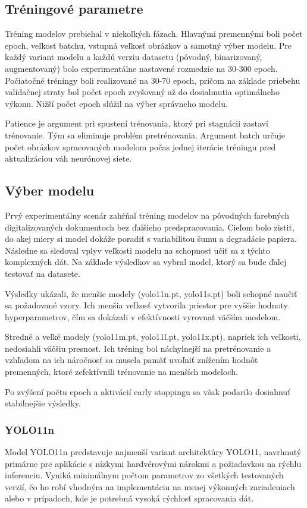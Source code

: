     \subsection{Tréningové parametre}
    Tréning modelov prebiehal v niekoľkých fázach. Hlavnými premennými boli počet epoch, veľkosť batchu, vstupná veľkosť obrázkov a samotný výber modelu. Pre každý variant modelu a každú verziu datasetu (pôvodný, binarizovaný, augmentovaný) bolo experimentálne nastavené rozmedzie na 30-300 epoch. Počiatočné tréningy boli realizované na 30-70 epoch, pričom na základe priebehu validačnej straty bol počet epoch zvyšovaný až do dosiahnutia optimálneho výkonu. Nižší počet epoch slúžil na výber správneho modelu.

    Patience je argument pri spustení trénovania, ktorý pri stagnácii zastaví trénovanie. Tým sa eliminuje problém pretrénovania. Argument batch určuje počet obrázkov spracovaných modelom počas jednej iterácie tréningu pred aktualizáciou váh neurónovej siete\cite{ultralytics_batch}.
    \subsection{Výber modelu}
            Prvý experimentálny scenár zahŕňal tréning modelov na pôvodných farebných digitalizovaných dokumentoch bez ďalšieho predspracovania. Cieľom bolo zistiť, do akej miery si model dokáže poradiť s variabilitou šumu a degradácie papiera. Následne sa sledoval vplyv veľkosti modelu na schopnosť učiť sa z týchto komplexných dát. Na základe výsledkov sa vybral model, ktorý sa bude ďalej testovať na datasete.
    
            Výsledky ukázali, že menšie modely (yolo11n.pt, yolo11s.pt) boli schopné naučiť sa požadované vzory. Ich menšia veľkosť vytvorila priestor pre vyššie hodnoty hyperparametrov, čím sa dokázali v efektívnosti vyrovnať väčším modelom.
            
            Stredné a veľké modely (yolo11m.pt, yolo11l.pt, yolo11x.pt), napriek ich veľkosti, nedosiahli väčšiu presnosť. Ich tréning bol náchylnejší na pretrénovanie a vzhľadom na ich náročnosť sa musela pamäť uvoľniť znížením hodnôt premenných, ktoré zefektívnili trénovanie na menších modeloch.
            
            Po zvýšení počtu epoch a aktivácií early stoppingu sa však podarilo dosiahnuť stabilnejšie výsledky.
            \subsubsection{YOLO11n}
            Model YOLO11n predstavuje najmenší variant architektúry YOLO11, navrhnutý primárne pre aplikácie s nízkymi hardvérovými nárokmi a požiadavkou na rýchlu inferenciu. Vyniká minimálnym počtom parametrov zo všetkých testovaných verzií, čo ho robí vhodným na implementáciu na menej výkonných zariadeniach alebo v prípadoch, kde je potrebná vysoká rýchlosť spracovania dát.

